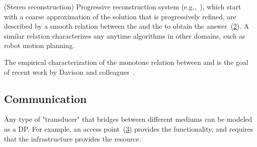 \begin{figure}[h]
    \centering
    \caption{\label{fig:gmapping} }
\end{figure}



\begin{example}
(Stereo reconstruction)
    Progressive reconstruction system (e.g.,~\cite{locher16progressive}),
    which start with a coarse approximation of the solution that is progressively
    refined, are described by a smooth relation between the 
    and the  to obtain the answer~(\cref{fig:progressive}).
    A similar relation characterizes any anytime algorithms in other domains,
    such as robot motion planning.
\end{example}


\begin{figure}[h]
    \centering
    \caption{\label{fig:progressive}}
\end{figure}


\begin{example}
    The empirical characterization of the monotone relation between  and 
    is the goal of recent work by Davison and colleagues~\cite{nardi15introducing,zia16comparative}.
\end{example}


\subsection{Communication}

\begin{example}[Transducers]
    Any type of "transducer" that bridges between different
    mediums can be modeled as a DP. For example, an access point~(\cref{fig:accesspoint})
    provides the  functionality, and requires
    that the infrastructure provides the  resource.
\end{example}


\begin{figure}[h]
    \centering
    \caption{\label{fig:accesspoint}}
\end{figure}

